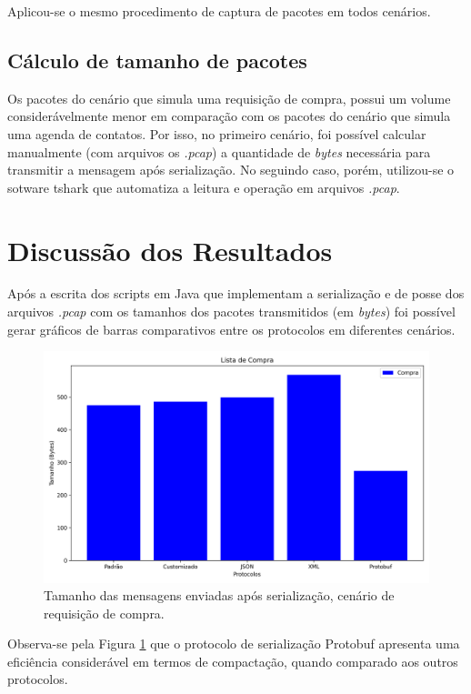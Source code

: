 \documentclass{article}
\begin{document}
Aplicou-se o mesmo procedimento de captura de pacotes em todos cenários.

\subsection{Cálculo de tamanho de pacotes}
Os pacotes do cenário que simula uma requisição de compra, possui um volume considerávelmente menor em comparação com os
pacotes do cenário que simula uma agenda de contatos. Por isso, no primeiro cenário, foi possível calcular manualmente (com arquivos os \textit{.pcap}) a quantidade de \textit{bytes} necessária para transmitir a mensagem após serialização. No seguindo caso, porém, utilizou-se o sotware tshark que automatiza a leitura e operação em arquivos \textit{.pcap}.



\section{Discussão dos Resultados}

Após a escrita dos scripts em Java que implementam a serialização e de posse dos arquivos \textit{.pcap} com os tamanhos dos pacotes transmitidos (em \textit{bytes}) foi possível
gerar gráficos de barras comparativos entre os protocolos em diferentes cenários.

\begin{figure}[H]
    \centering
    \includegraphics[width=\textwidth]{imgs/compra_data_size.png}
    \caption{Tamanho das mensagens enviadas após serialização, cenário de requisição de compra.}
    \label{fig:compra}
\end{figure}

Observa-se pela Figura \ref{fig:compra} que o protocolo de serialização Protobuf apresenta uma eficiência considerável em termos de compactação, quando comparado aos outros protocolos.
\end{document}
